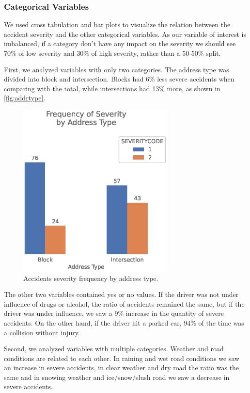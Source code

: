 \documentclass[12pt]{article}
\begin{document}
\subsubsection{Categorical Variables}

We used cross tabulation and bar plots to visualize the relation between the accident severity and the other categorical variables. As our variable of interest is imbalanced, if a category don't have any impact on the severity we should see 70\% of low severity and 30\% of high severity, rather than a 50-50\% split.

First, we analyzed variables with only two categories. The address type was divided into block and intersection. Blocks had 6\% less severe accidents when comparing with the total, while intersections had 13\% more, as shown in \autoref{fig:addrtype}.
\begin{figure}
        \centering
        \includegraphics[width=0.7\textwidth]{plot_addrtype.eps}
        \caption{Accidents severity frequency by address type.\label{fig:addrtype}}
\end{figure}
The other two variables contained yes or no values. If the driver was not under influence of drugs or alcohol, the ratio of accidents remained the same, but if the driver was under influence, we saw a 9\% increase in the quantity of severe accidents. On the other hand, if the driver hit a parked car, 94\% of the time was a collision without injury.

Second, we analyzed variables with multiple categories. Weather and road conditions are related to each other. In raining and wet road conditions we saw an increase in severe accidents, in clear weather and dry road the ratio was the same and in snowing weather and ice/snow/slush road we saw a decrease in severe accidents.
\end{document}
